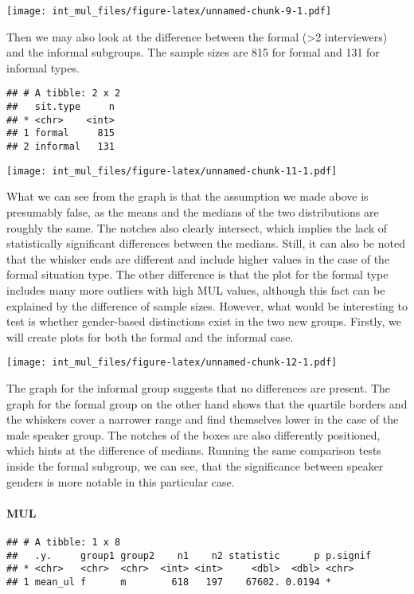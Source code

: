\documentclass[
]{article}
\begin{document}
\texttt{[image: int\_mul\_files/figure-latex/unnamed-chunk-9-1.pdf]}

Then we may also look at the difference between the formal
(\textgreater2 interviewers) and the informal subgroups. The sample
sizes are 815 for formal and 131 for informal types.

\begin{verbatim}
## # A tibble: 2 x 2
##   sit.type     n
## * <chr>    <int>
## 1 formal     815
## 2 informal   131
\end{verbatim}

\texttt{[image: int\_mul\_files/figure-latex/unnamed-chunk-11-1.pdf]}

What we can see from the graph is that the assumption we made above is
presumably false, as the means and the medians of the two distributions
are roughly the same. The notches also clearly intersect, which implies
the lack of statistically significant differences between the medians.
Still, it can also be noted that the whisker ends are different and
include higher values in the case of the formal situation type. The
other difference is that the plot for the formal type includes many more
outliers with high MUL values, although this fact can be explained by
the difference of sample sizes. However, what would be interesting to
test is whether gender-based distinctions exist in the two new groups.
Firstly, we will create plots for both the formal and the informal case.

\texttt{[image: int\_mul\_files/figure-latex/unnamed-chunk-12-1.pdf]}

The graph for the informal group suggests that no differences are
present. The graph for the formal group on the other hand shows that the
quartile borders and the whiskers cover a narrower range and find
themselves lower in the case of the male speaker group. The notches of
the boxes are also differently positioned, which hints at the difference
of medians. Running the same comparison tests inside the formal
subgroup, we can see, that the significance between speaker genders is
more notable in this particular case.

\hypertarget{mul-1}{%
\paragraph{MUL}\label{mul-1}}

\begin{verbatim}
## # A tibble: 1 x 8
##   .y.     group1 group2    n1    n2 statistic      p p.signif
## * <chr>   <chr>  <chr>  <int> <int>     <dbl>  <dbl> <chr>   
## 1 mean_ul f      m        618   197    67602. 0.0194 *
\end{verbatim}
\end{document}
